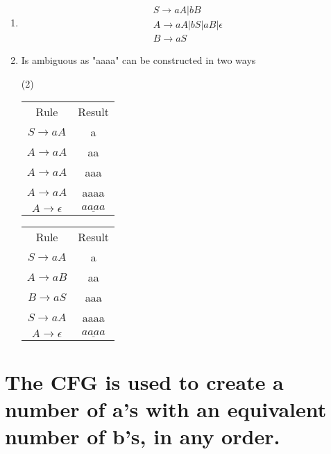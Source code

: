 \documentclass{article} %
\begin{document}
    \section{}
        \begin{enumerate}
            \item
            \begin{gather*}
                S \to aA | bB\\
                A \to aA | bS | aB | \epsilon\\
                B \to aS
            \end{gather*}
            \item Is ambiguous as "aaaa" can be constructed in two ways
            \begin{center}
                \begin{varwidth}{\textwidth}
                \begin{tasks}[label={(\Roman*)},label-width={1cm}] (2)
                    \task
                    \begin{tabular}{ c c}
                        Rule & Result\\
                        $S \to aA$ & a\\
                        $A \to aA$ & aa\\
                        $A \to aA$ & aaa\\
                        $A \to aA$ & aaaa\\
                        $A \to \epsilon$ & $\underline{aaaa}$
                    \end{tabular}

                    \task
                    \begin{tabular}{ c c}
                        Rule & Result\\
                        $S \to aA$ & a\\
                        $A \to aB$ & aa\\
                        $B \to aS$ & aaa\\
                        $S \to aA$ & aaaa\\
                        $A \to \epsilon$ & $\underline{aaaa}$
                    \end{tabular}
                \end{tasks}
                \end{varwidth}
            \end{center}
        \end{enumerate}
    \section{ The CFG is used to create a number of a's with an equivalent number of b's, in any order.}
\end{document}
